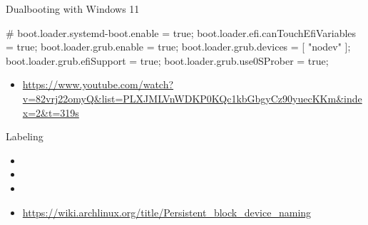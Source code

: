 \begin{frame}[fragile]{Dualbooting with Windows 11}
  \centering
  \begin{terminal}[minted language=nix]
    # boot.loader.systemd-boot.enable = true;
    boot.loader.efi.canTouchEfiVariables = true;
    boot.loader.grub.enable = true;
    boot.loader.grub.devices = [ "nodev" ];
    boot.loader.grub.efiSupport = true;
    boot.loader.grub.use0SProber = true;
  \end{terminal}
  \begin{itemize}
  \item \url{https://www.youtube.com/watch?v=82vrj22omyQ&list=PLXJMLVnWDKP0KQc1kbGbgyCz90yuecKKm&index=2&t=319s}
  \end{itemize}
\end{frame}

\begin{frame}[fragile]{Labeling}
  \begin{itemize}
    \item {}
    \item {}
    \item {}
    \item \url{https://wiki.archlinux.org/title/Persistent_block_device_naming}
  \end{itemize}
\end{frame}

%
